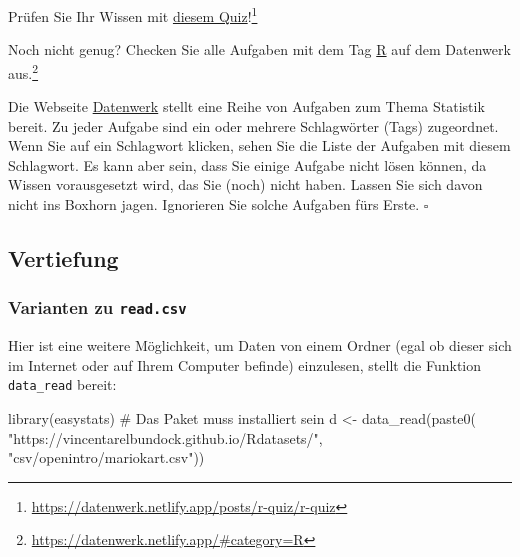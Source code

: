 \documentclass[
  letterpaper,
  DIV=11,
  numbers=noendperiod]{scrartcl}
\newenvironment{Shaded}{\begin{snugshade}}{\end{snugshade}}
\newcommand{\CommentTok}[1]{\textcolor[rgb]{0.37,0.37,0.37}{#1}}
\newcommand{\FunctionTok}[1]{\textcolor[rgb]{0.28,0.35,0.67}{#1}}
\newcommand{\NormalTok}[1]{\textcolor[rgb]{0.00,0.23,0.31}{#1}}
\newcommand{\OtherTok}[1]{\textcolor[rgb]{0.00,0.23,0.31}{#1}}
\newcommand{\StringTok}[1]{\textcolor[rgb]{0.13,0.47,0.30}{#1}}
\theoremstyle{definition}
\theoremstyle{definition}
\theoremstyle{definition}
\theoremstyle{remark}
\begin{document}
Prüfen Sie Ihr Wissen mit
\href{https://datenwerk.netlify.app/posts/r-quiz/r-quiz}{diesem
Quiz}!\footnote{\url{https://datenwerk.netlify.app/posts/r-quiz/r-quiz}}

Noch nicht genug? Checken Sie alle Aufgaben mit dem Tag
\href{https://datenwerk.netlify.app/\#category=R}{R} auf dem Datenwerk
aus.\footnote{\url{https://datenwerk.netlify.app/\#category=R}}

\begin{tcolorbox}[enhanced jigsaw, coltitle=black, colframe=quarto-callout-note-color-frame, opacityback=0, toprule=.15mm, opacitybacktitle=0.6, arc=.35mm, titlerule=0mm, toptitle=1mm, title=\textcolor{quarto-callout-note-color}{\faInfo}\hspace{0.5em}{Note}, bottomtitle=1mm, leftrule=.75mm, breakable, rightrule=.15mm, colbacktitle=quarto-callout-note-color!10!white, bottomrule=.15mm, colback=white, left=2mm]

Die Webseite \href{https://datenwerk.netlify.app/}{Datenwerk} stellt
eine Reihe von Aufgaben zum Thema Statistik bereit. Zu jeder Aufgabe
sind ein oder mehrere Schlagwörter (Tags) zugeordnet. Wenn Sie auf ein
Schlagwort klicken, sehen Sie die Liste der Aufgaben mit diesem
Schlagwort. Es kann aber sein, dass Sie einige Aufgabe nicht lösen
können, da Wissen vorausgesetzt wird, das Sie (noch) nicht haben. Lassen
Sie sich davon nicht ins Boxhorn jagen. Ignorieren Sie solche Aufgaben
fürs Erste. \(\square\)

\end{tcolorbox}

\subsection{Vertiefung}\label{vertiefung-1}

\subsubsection{\texorpdfstring{Varianten zu
\texttt{read.csv}}{Varianten zu read.csv}}\label{varianten-zu-read.csv}

Hier ist eine weitere Möglichkeit, um Daten von einem Ordner (egal ob
dieser sich im Internet oder auf Ihrem Computer befinde) einzulesen,
stellt die Funktion \texttt{data\_read} bereit:

\begin{Shaded}
\begin{Highlighting}[]
\FunctionTok{library}\NormalTok{(easystats)  }\CommentTok{\# Das Paket muss installiert sein}
\NormalTok{d }\OtherTok{\textless{}{-}} \FunctionTok{data\_read}\NormalTok{(}\FunctionTok{paste0}\NormalTok{(}
  \StringTok{"https://vincentarelbundock.github.io/Rdatasets/"}\NormalTok{,}
  \StringTok{"csv/openintro/mariokart.csv"}\NormalTok{))}
\end{Highlighting}
\end{Shaded}
\end{document}
